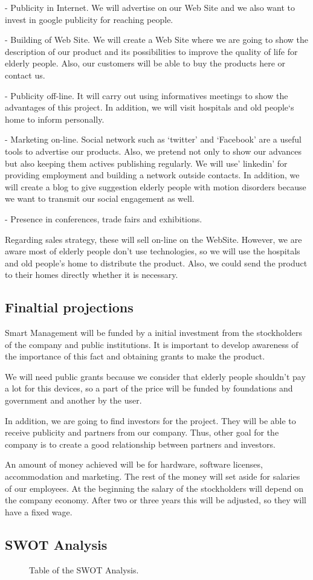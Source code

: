 -	Publicity in Internet. We will advertise on our Web Site and we also want to invest in google publicity for reaching people.

-	Building of Web Site. We will create a Web Site where we are going to show the description of our product and its possibilities to improve the quality of life for elderly people. Also, our customers will be able to buy the products here or contact us.

-	Publicity off-line. It will carry out using informatives meetings to show the advantages of this project. In addition, we will visit hospitals and old people`s home to inform personally.

-	Marketing on-line. Social network such as ‘twitter’ and ‘Facebook’ are a useful tools to advertise our products. Also, we pretend not only to show our advances but also keeping them actives publishing regularly.
We will use’ linkedin’ for providing employment and building a network outside contacts.
In addition, we will create a blog to give suggestion elderly people with motion disorders because we want to transmit our social engagement as well.

-	Presence in conferences, trade fairs and exhibitions.

Regarding sales strategy, these will sell on-line on the WebSite. However, we are aware  most of elderly people don’t use technologies, so we will use the hospitals and old people’s home to distribute the product. Also, we could send the product to their homes directly whether it is necessary.


\subsection{Finaltial projections}
Smart Management will be funded by a initial investment from the stockholders of the company and public institutions. It is important to develop awareness of the importance of this fact and obtaining grants to make the product.

We will need public grants because we consider that elderly people shouldn't pay a lot for this devices, so a part of the price will be funded by foundations and government and another by the user.

In addition, we are going to find investors for the project. They will be able to receive publicity and partners from our company. Thus, other goal for the company is to create a good relationship between partners and investors.

An amount of money achieved will be for hardware, software licenses, accommodation and marketing. The rest of the money will set aside for salaries of our employees. At the beginning the salary of the stockholders will depend on the company economy. After two or three years this will be adjusted, so they will have a fixed wage.


\subsection{SWOT Analysis}
\begin{figure}[H]
	\centering
	\caption{Table of the SWOT Analysis.}
	\label{fig:SWOT}
\end{figure}


